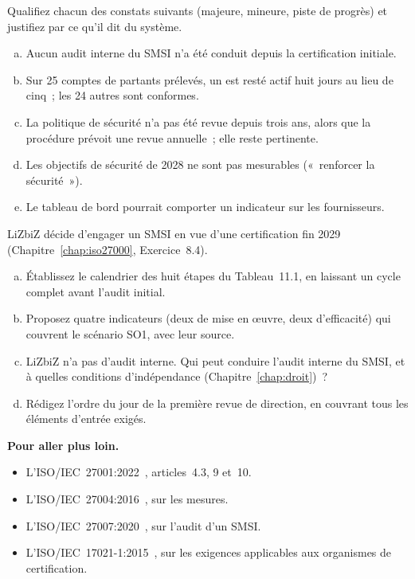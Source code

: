 \begin{boxexo}[title={\ding{45}\quad Exercice~11.3. Qualifier \niveaumoyen}]
Qualifiez chacun des constats suivants (majeure, mineure, piste de
progrès) et justifiez par ce qu'il dit du système.
\begin{enumerate}[(a)]
    \item Aucun audit interne du SMSI n'a été conduit depuis la
          certification initiale.
    \item Sur 25 comptes de partants prélevés, un est resté actif huit jours
          au lieu de cinq~; les 24 autres sont conformes.
    \item La politique de sécurité n'a pas été revue depuis trois ans,
          alors que la procédure prévoit une revue annuelle~; elle reste
          pertinente.
    \item Les objectifs de sécurité de 2028 ne sont pas mesurables
          («~renforcer la sécurité~»).
    \item Le tableau de bord pourrait comporter un indicateur sur les
          fournisseurs.
\end{enumerate}
\end{boxexo}

\begin{boxexo}[title={\ding{45}\quad Exercice~11.4. Le SMSI de LiZbiZ \niveauexpert}]
LiZbiZ décide d'engager un SMSI en vue d'une certification fin 2029
(Chapitre~\ref{chap:iso27000}, Exercice~8.4).
\begin{enumerate}[(a)]
    \item Établissez le calendrier des huit étapes du Tableau~11.1, en
          laissant un cycle complet avant l'audit initial.
    \item Proposez quatre indicateurs (deux de mise en œuvre, deux
          d'efficacité) qui couvrent le scénario SO1, avec leur source.
    \item LiZbiZ n'a pas d'audit interne. Qui peut conduire l'audit interne
          du SMSI, et à quelles conditions d'indépendance
          (Chapitre~\ref{chap:droit})~?
    \item Rédigez l'ordre du jour de la première revue de direction, en
          couvrant tous les éléments d'entrée exigés.
\end{enumerate}
\end{boxexo}

\bigskip

\begin{boxinfo}
\textbf{Pour aller plus loin.}
\begin{itemize}
    \item L'ISO/IEC~27001:2022~\cite{iso27001_2022}, articles~4.3, 9 et~10.
    \item L'ISO/IEC~27004:2016~\cite{iso27004_2016}, sur les mesures.
    \item L'ISO/IEC~27007:2020~\cite{iso27007_2020}, sur l'audit d'un SMSI.
    \item L'ISO/IEC~17021-1:2015~\cite{iso17021_2015}, sur les exigences
          applicables aux organismes de certification.
\end{itemize}
\end{boxinfo}

